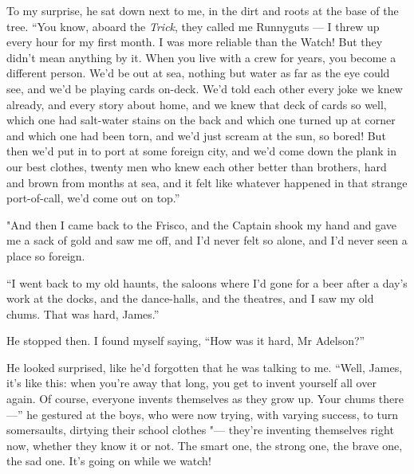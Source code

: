 To my surprise, he sat down next to me, in the dirt and roots at
the base of the tree.
``You know, aboard the \emph{Trick}, they called me Runnyguts --- I threw up 
every hour for my first month. I was more reliable than the Watch! But they 
didn't mean anything by it. When you live with a crew for years, you become a 
different person. We'd be out at sea, nothing but water as far as the eye could 
see, and we'd be playing cards on-deck. We'd told each other every joke we knew 
already, and every story about home, and we knew that deck of cards so well, 
which one had salt-water stains on the back and which one turned up at corner 
and which one had been torn, and we'd just scream at the sun, so bored! But 
then we'd put in to port at some foreign city, and we'd come down the plank in 
our best clothes, twenty men who knew each other better than brothers, hard and 
brown from months at sea, and it felt like whatever happened in that strange 
port-of-call, we'd come out on top.''

"And then I came back to the Frisco, and the Captain shook my hand
and gave me a sack of gold and saw me off, and I'd never felt so
alone, and I'd never seen a place so foreign.

``I went back to my old haunts, the saloons where I'd gone for a beer after a 
day's work at the docks, and the dance-halls, and the theatres, and I saw my 
old chums. That was hard, James.''

He stopped then. I found myself saying,
``How was it hard, Mr Adelson?''

He looked surprised, like he'd forgotten that he was talking to me.
``Well, James, it's like this: when you're away that long, you get to invent 
yourself all over again. Of course, everyone invents themselves as they grow 
up. Your chums there ---''
he gestured at the boys, who were now trying, with varying success,
to turn somersaults, dirtying their school clothes "--- they're
inventing themselves right now, whether they know it or not. The
smart one, the strong one, the brave one, the sad one. It's going
on while we watch!

